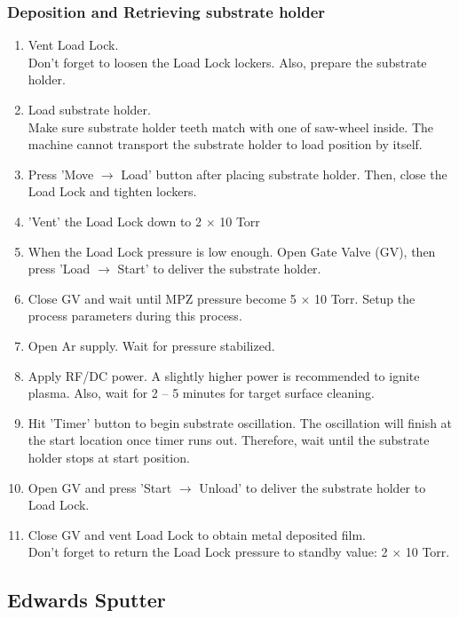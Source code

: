 \subsubsection{Deposition and Retrieving substrate holder}
\begin{enumerate}
\item Vent Load Lock. \\
  Don't forget to loosen the Load Lock lockers. Also, prepare the substrate holder.
\item Load substrate holder. \\
  Make sure substrate holder teeth match with one of saw-wheel inside. %
  The machine cannot transport the substrate holder to load position by itself. %
\item Press 'Move $\rightarrow$ Load' button after placing substrate holder. %
  Then, close the Load Lock and tighten lockers.
\item 'Vent' the Load Lock down to 2 $\times$ 10 Torr
\item When the Load Lock pressure is low enough. Open Gate Valve (GV), %
  then press 'Load $\rightarrow$ Start'  to deliver the substrate holder.
\item Close GV and wait until MPZ pressure become 5 $\times$ 10 Torr.
  Setup the process parameters during this process.
\item Open Ar supply. Wait for pressure stabilized. 
\item Apply RF/DC power. A slightly higher power is recommended to ignite plasma. Also, wait for 2 -- 5 minutes for target surface cleaning.
\item Hit 'Timer' button to begin substrate oscillation. The oscillation will finish at the start location once timer runs out. Therefore, wait until the substrate holder stops at start position.
\item Open GV and press 'Start $\rightarrow$ Unload' to deliver the substrate holder to Load Lock.
\item Close GV and vent Load Lock to obtain metal deposited film. \\
  Don't forget to return the Load Lock pressure to standby value: 2 $\times$ 10 Torr.
\end{enumerate}

\subsection{Edwards Sputter}
